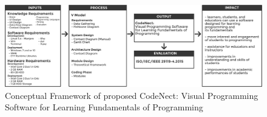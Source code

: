 \begin{figure}[H]
	\centering
	\captionsetup{justification=centering}
	\includegraphics[width=\linewidth]{figures/conceptual_framework.png}
	\caption[Conceptual Framework]{Conceptual Framework of proposed CodeNect: Visual Programming Software for Learning Fundamentals of Programming}
	\label{fig:conceptual_framework}
\end{figure}

